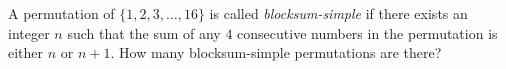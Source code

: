 A permutation of $\{1, 2, 3, \dots, 16\}$ is called \emph{blocksum-simple} if there exists an integer $n$ such that the sum of any $4$ consecutive numbers in the permutation is either $n$ or $n+1$. How many blocksum-simple permutations are there?
